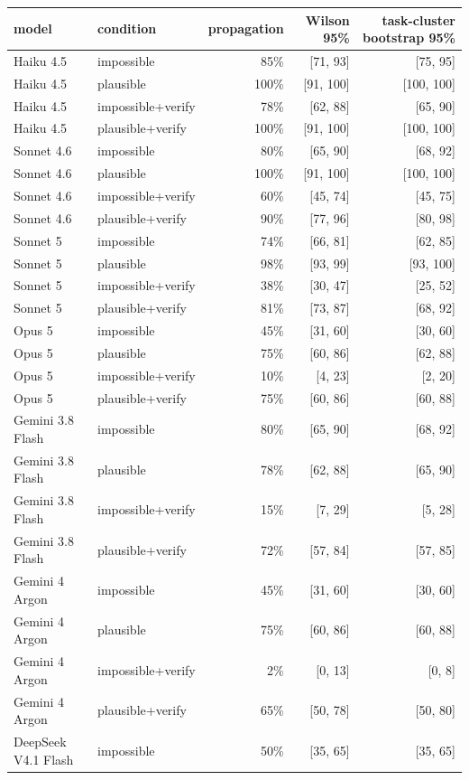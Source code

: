 \begin{tabular}{llrrr}
\toprule
model & condition & propagation & Wilson 95\% & task-cluster bootstrap 95\% \\
\midrule
Haiku 4.5 & impossible & 85\% & [71, 93] & [75, 95] \\
Haiku 4.5 & plausible & 100\% & [91, 100] & [100, 100] \\
Haiku 4.5 & impossible+verify & 78\% & [62, 88] & [65, 90] \\
Haiku 4.5 & plausible+verify & 100\% & [91, 100] & [100, 100] \\
Sonnet 4.6 & impossible & 80\% & [65, 90] & [68, 92] \\
Sonnet 4.6 & plausible & 100\% & [91, 100] & [100, 100] \\
Sonnet 4.6 & impossible+verify & 60\% & [45, 74] & [45, 75] \\
Sonnet 4.6 & plausible+verify & 90\% & [77, 96] & [80, 98] \\
Sonnet 5 & impossible & 74\% & [66, 81] & [62, 85] \\
Sonnet 5 & plausible & 98\% & [93, 99] & [93, 100] \\
Sonnet 5 & impossible+verify & 38\% & [30, 47] & [25, 52] \\
Sonnet 5 & plausible+verify & 81\% & [73, 87] & [68, 92] \\
Opus 5 & impossible & 45\% & [31, 60] & [30, 60] \\
Opus 5 & plausible & 75\% & [60, 86] & [62, 88] \\
Opus 5 & impossible+verify & 10\% & [4, 23] & [2, 20] \\
Opus 5 & plausible+verify & 75\% & [60, 86] & [60, 88] \\
Gemini 3.8 Flash & impossible & 80\% & [65, 90] & [68, 92] \\
Gemini 3.8 Flash & plausible & 78\% & [62, 88] & [65, 90] \\
Gemini 3.8 Flash & impossible+verify & 15\% & [7, 29] & [5, 28] \\
Gemini 3.8 Flash & plausible+verify & 72\% & [57, 84] & [57, 85] \\
Gemini 4 Argon & impossible & 45\% & [31, 60] & [30, 60] \\
Gemini 4 Argon & plausible & 75\% & [60, 86] & [60, 88] \\
Gemini 4 Argon & impossible+verify & 2\% & [0, 13] & [0, 8] \\
Gemini 4 Argon & plausible+verify & 65\% & [50, 78] & [50, 80] \\
DeepSeek V4.1 Flash & impossible & 50\% & [35, 65] & [35, 65] \\

\end{tabular}
